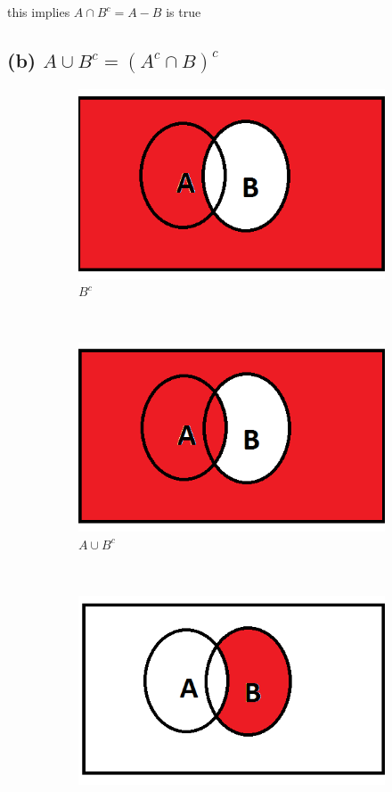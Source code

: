 \documentclass[a4paper,11pt]{report}
\begin{document}
this implies $A \cap B^c = A-B$ is true
\subsection*{(b) $A \cup B^c = (A^c\cap B)^c$}
\begin{figure}[hb]
  \centering
    \begin{subfigure}[b]{0.25\textwidth}
        \includegraphics[width=\textwidth]{BC}
        \caption{$B^c$}
    \end{subfigure}
 ~
    \begin{subfigure}[b]{0.25\textwidth}
        \includegraphics[width=\textwidth]{AuBc}
        \caption{$A \cup B^c$}
    \end{subfigure}
 ~
    \begin{subfigure}[b]{0.25\textwidth}
        \includegraphics[width=\textwidth]{AcnB}

\end{subfigure}
\end{figure}
\end{document}
